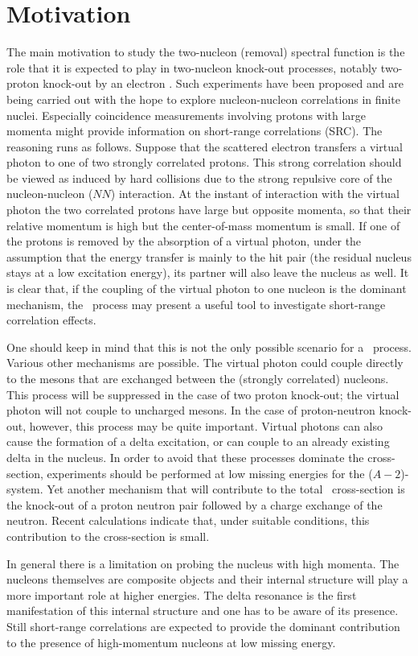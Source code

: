 \section{Motivation}
The main motivation to study the two-nucleon (removal) spectral function
is the role that it is expected to play in two-nucleon knock-out processes, 
notably two-proton knock-out by an electron \eepp. 
Such experiments have 
been proposed\cite{Prop} and are being carried out with the hope
to explore nucleon-nucleon correlations in finite nuclei. 
Especially coincidence measurements involving protons with large momenta might 
provide information on short-range correlations (SRC). The reasoning runs as 
follows\cite{GP94}.
Suppose that the scattered electron 
transfers a virtual photon to one of two strongly correlated protons. This 
strong correlation should be viewed as induced by
hard collisions due to the strong 
repulsive core of the nucleon-nucleon ($NN$) interaction. At the instant
of interaction with the virtual photon the two correlated
protons have large but opposite momenta, so that their relative momentum is
high but the center-of-mass momentum is small. If one of the protons is 
removed
by the absorption of a virtual photon, under the assumption that the 
energy transfer is mainly to the hit pair (the residual nucleus stays at a 
low excitation energy), its partner will also leave the nucleus 
as well. 
It is clear that, if the coupling of the virtual photon to one nucleon
is the dominant mechanism, the
\eepp\ process may present a useful tool to
 investigate short-range correlation effects.

One should keep in mind that this is not the only possible scenario for a 
\eepp\
process. Various other mechanisms are possible.
The virtual photon could couple directly to the mesons that are exchanged 
between the (strongly correlated) nucleons. This process will be suppressed 
in the case of two proton 
knock-out; the virtual photon will not couple to uncharged mesons.  In the case
of proton-neutron knock-out, however, this process may be quite 
important\cite{Ry94}.
Virtual photons can
also cause the formation of a delta excitation, or can couple to an already
existing delta in the nucleus. 
In order to avoid that these processes dominate the cross-section, 
experiments should be performed at low missing energies for the 
($A-2$)-system.
Yet another mechanism that will contribute to the total \eepp\ cross-section
is the knock-out of a proton neutron pair followed by a charge exchange of the
neutron. 
Recent calculations\cite{GP95} indicate that, under suitable conditions,
this contribution to the cross-section is small.

In general there is a limitation on probing 
the nucleus with high momenta. The nucleons themselves are 
composite objects and their internal structure will play a more important 
role at higher energies. The delta resonance is the first manifestation of 
this internal structure and one has to be aware of its presence. Still 
short-range correlations are expected to provide the dominant contribution to 
the presence of high-momentum nucleons at low missing energy.
